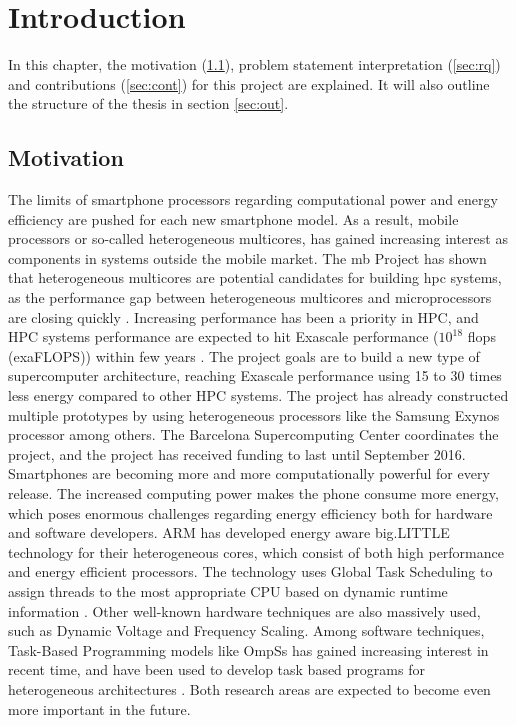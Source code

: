 \chapter{Introduction}
In this chapter, the motivation (\ref{sec:mot}), problem statement interpretation (\ref{sec:rq}) and contributions (\ref{sec:cont}) for this project are explained. It will also outline the structure of the thesis in section \ref{sec:out}.

\section{Motivation}
\label{sec:mot}
The limits of smartphone processors regarding computational power and energy efficiency are pushed for each new smartphone model. As a result, mobile processors or so-called heterogeneous multicores, has gained increasing interest as components in systems outside the mobile market. The \gls{mb} Project \cite{MB} has shown that heterogeneous multicores are potential candidates for building \gls{hpc} systems, as the performance gap between heterogeneous multicores and microprocessors are closing quickly \cite{a:MB:Raj13}. Increasing performance has been a priority in HPC, and HPC systems performance are expected to hit Exascale performance ($10^{18}$ \gls{flops} (exaFLOPS)) within few years \cite{TOP500}. The project goals are to build a new type of supercomputer architecture, reaching Exascale performance using 15 to 30 times less energy compared to other HPC systems. The project has already constructed multiple prototypes by using heterogeneous processors like the Samsung Exynos \cite{EXY} processor among others. The Barcelona Supercomputing Center coordinates the project, and the project has received funding to last until September 2016. \\

Smartphones are becoming more and more computationally powerful for every release. The increased computing power makes the phone consume more energy, which poses enormous challenges regarding energy efficiency both for hardware and software developers. ARM has developed energy aware big.LITTLE technology for their heterogeneous cores, which consist of both high performance and energy efficient processors. The technology uses Global Task Scheduling to assign threads to the most appropriate CPU based on dynamic runtime information \cite{a:ARM:bL}. Other well-known hardware techniques are also massively used, such as Dynamic Voltage and Frequency Scaling. Among software techniques, Task-Based Programming models like OmpSs \cite{a:ompss2013} has gained increasing interest in recent time, and have been used to develop task based programs for heterogeneous architectures \cite{a:Lien2012}. Both research areas are expected to become even more important in the future. \\

